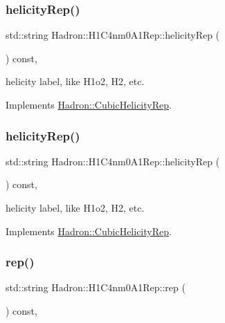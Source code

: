 \subsubsection{\texorpdfstring{helicityRep()}{helicityRep()}\hspace{0.1cm}{\footnotesize\ttfamily [2/3]}}
{\footnotesize\ttfamily std\+::string Hadron\+::\+H1\+C4nm0\+A1\+Rep\+::helicity\+Rep (\begin{DoxyParamCaption}{ }\end{DoxyParamCaption}) const\hspace{0.3cm}{\ttfamily [inline]}, {\ttfamily [virtual]}}

helicity label, like H1o2, H2, etc. 

Implements \mbox{\hyperlink{structHadron_1_1CubicHelicityRep_af1096946b7470edf0a55451cc662f231}{Hadron\+::\+Cubic\+Helicity\+Rep}}.

\mbox{\label{structHadron_1_1H1C4nm0A1Rep_a018d2e78677dfe6d57d9cbc95e554618}} 
\subsubsection{\texorpdfstring{helicityRep()}{helicityRep()}\hspace{0.1cm}{\footnotesize\ttfamily [3/3]}}
{\footnotesize\ttfamily std\+::string Hadron\+::\+H1\+C4nm0\+A1\+Rep\+::helicity\+Rep (\begin{DoxyParamCaption}{ }\end{DoxyParamCaption}) const\hspace{0.3cm}{\ttfamily [inline]}, {\ttfamily [virtual]}}

helicity label, like H1o2, H2, etc. 

Implements \mbox{\hyperlink{structHadron_1_1CubicHelicityRep_af1096946b7470edf0a55451cc662f231}{Hadron\+::\+Cubic\+Helicity\+Rep}}.

\mbox{\label{structHadron_1_1H1C4nm0A1Rep_acc6e3a3585fdfea2b5ef14c6035964e2}} 
\subsubsection{\texorpdfstring{rep()}{rep()}\hspace{0.1cm}{\footnotesize\ttfamily [1/5]}}
{\footnotesize\ttfamily std\+::string Hadron\+::\+H1\+C4nm0\+A1\+Rep\+::rep (\begin{DoxyParamCaption}{ }\end{DoxyParamCaption}) const\hspace{0.3cm}{\ttfamily [inline]}, {\ttfamily [virtual]}}



